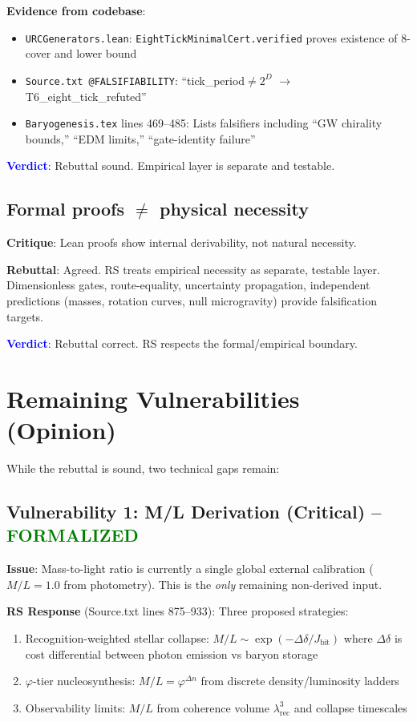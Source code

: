 \documentclass[11pt]{article}
\begin{document}
\noindent\textbf{Evidence from codebase}:
\begin{itemize}
\item \texttt{URCGenerators.lean}: \texttt{EightTickMinimalCert.verified} proves existence of 8-cover and lower bound
\item \texttt{Source.txt @FALSIFIABILITY}: ``tick\_period$\neq 2^D$ $\to$ T6\_eight\_tick\_refuted''
\item \texttt{Baryogenesis.tex} lines 469--485: Lists falsifiers including ``GW chirality bounds,'' ``EDM limits,'' ``gate-identity failure''
\end{itemize}

\noindent\textcolor{blue}{\textbf{Verdict}}: Rebuttal sound. Empirical layer is separate and testable.

\subsection{Formal proofs $\neq$ physical necessity}

\textbf{Critique}: Lean proofs show internal derivability, not natural necessity.

\textbf{Rebuttal}: Agreed. RS treats empirical necessity as separate, testable layer. Dimensionless gates, route-equality, uncertainty propagation, independent predictions (masses, rotation curves, null microgravity) provide falsification targets.

\noindent\textcolor{blue}{\textbf{Verdict}}: Rebuttal correct. RS respects the formal/empirical boundary.

\section{Remaining Vulnerabilities (Opinion)}

While the rebuttal is sound, two technical gaps remain:

\subsection{Vulnerability 1: M/L Derivation (Critical) -- \textcolor{green}{FORMALIZED}}

\textbf{Issue}: Mass-to-light ratio is currently a single global external calibration ($M/L=1.0$ from photometry). This is the \emph{only} remaining non-derived input.

\textbf{RS Response} (Source.txt lines 875--933): Three proposed strategies:
\begin{enumerate}
\item Recognition-weighted stellar collapse: $M/L \sim \exp(-\Delta\delta/J_{\text{bit}})$ where $\Delta\delta$ is cost differential between photon emission vs baryon storage
\item $\varphi$-tier nucleosynthesis: $M/L = \varphi^{\Delta n}$ from discrete density/luminosity ladders
\item Observability limits: $M/L$ from coherence volume $\lambda_{\text{rec}}^3$ and collapse timescales
\end{enumerate}
\end{document}
